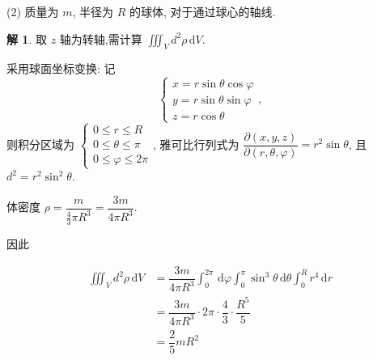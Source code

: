 \documentclass[a4paper,12pt]{article}
\theoremstyle{definition}
\newtheorem*{sol}{解}
\begin{document}
(2) 质量为 $m$, 半径为 $R$ 的球体, 对于通过球心的轴线.
\begin{sol}
    取 $z$ 轴为转轴,需计算 $\iiint_V d^2\rho\,\mathrm{d}V$.

    采用球面坐标变换: 记
    $$\begin{cases}
        x=r\sin\theta\cos\varphi \\
        y=r\sin\theta\sin\varphi \\
        z=r\cos\theta
    \end{cases},$$
    则积分区域为 $\begin{cases}
        0\leq r \leq R        \\
        0\leq \theta \leq \pi \\
        0\leq \varphi \leq 2\pi
    \end{cases}$, 雅可比行列式为 $\dfrac{\partial(x,y,z)}{\partial(r,\theta,\varphi)}=r^2\sin\theta$, 且 $d^2=r^2\sin^2\theta$.

    体密度 $\rho=\dfrac{m}{\frac{4}{3}\pi R^3}=\dfrac{3m}{4\pi R^3}$.

    因此

    \begin{align*}
        \iiint_V d^2\rho\,\mathrm{d}V
         & =\dfrac{3m}{4\pi R^3}\int_0^{2\pi}\,\mathrm{d}\varphi\int_0^{\pi}\sin^3\theta\,\mathrm{d}\theta\int_0^R r^4\,\mathrm{d}r \\
         & =\dfrac{3m}{4\pi R^3}\cdot 2\pi\cdot\dfrac{4}{3}\cdot\dfrac{R^5}{5}                                                        \\
         & =\dfrac{2}{5}mR^2
    \end{align*}
\end{sol}
\end{document}
